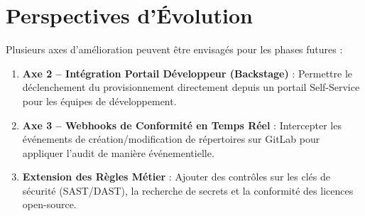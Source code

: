 \documentclass[12pt,a4paper]{report}
\begin{document}
\section*{Perspectives d'Évolution}
Plusieurs axes d'amélioration peuvent être envisagés pour les phases futures :
\begin{enumerate}
    \item \textbf{Axe 2 -- Intégration Portail Développeur (Backstage)} : Permettre le déclenchement du provisionnement directement depuis un portail Self-Service pour les équipes de développement.
    \item \textbf{Axe 3 -- Webhooks de Conformité en Temps Réel} : Intercepter les événements de création/modification de répertoires sur GitLab pour appliquer l'audit de manière événementielle.
    \item \textbf{Extension des Règles Métier} : Ajouter des contrôles sur les clés de sécurité (SAST/DAST), la recherche de secrets et la conformité des licences open-source.
\end{enumerate}
\end{document}
